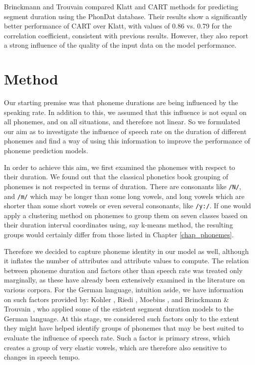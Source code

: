 \documentclass[11pt,a4paper]{scrbook}
\begin{document}
Brinckmann and Trouvain \cite{Brinckmann_2003} compared Klatt and CART methods for predicting segment duration using the PhonDat database. Their results show a significantly better performance of CART over Klatt, with values of 0.86 vs. 0.79 for the correlation coefficient, consistent with previous results. However, they also report a strong influence of  the quality of the input data on the model performance.

\section{Method}
Our starting premise was that phoneme durations are being influenced by the speaking rate. In addition to this, we assumed that this influence is not equal on all phonemes, and on all situations, and therefore not linear. So we formulated our aim as to investigate the influence of speech rate on the duration of different phonemes and find a way of using this information to improve the performance of phoneme prediction models. 

In order to achieve this aim, we first examined the phonemes with respect to their duration. We found out that the classical phonetics book grouping of phonemes is not respected in terms of duration. There are consonants like \texttt{/N/}, and \texttt{/m/} which may be longer than some long vowels, and long vowels which are shorter than some short vowels or even several consonants, like \texttt{/y:/}. If one would apply a clustering method on phonemes to group them on seven classes based on their duration interval coordinates using, say k-means method, the resulting groups would certainly differ from those listed in Chapter \ref{chap_phonemes}.  

Therefore we decided to capture phoneme identity in our model as well, although it inflates the number of attributes and attribute values to compute. The relation between phoneme duration and factors other than speech rate was treated only marginally, as these have already been extensively examined in the literature on various corpora. For the German language, intuition aside, we have information on such factors provided by: Kohler \cite{Kohler1992}, Riedi \cite{Riedi1995}, Moebius \cite{Moebius1996}, and Brinckmann \& Trouvain \cite{Brinckmann_2003}, who applied some of the existent segment duration models to the German language. At this stage, we considered such factors only to the extent they might have helped identify groups of phonemes that may be best suited to evaluate the influence of speech rate. Such a factor is primary stress, which creates a group of very elastic vowels, which are therefore also sensitive to changes in speech tempo.
\end{document}

